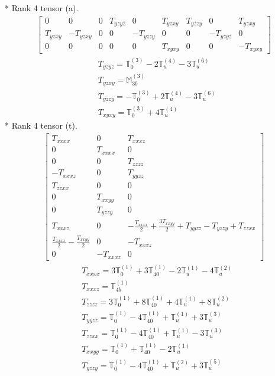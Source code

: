 \documentclass[fleqn,8pt,landscape]{jsarticle}
\begin{document}
* Rank 4 tensor (a).
\begin{align*}
\begin{bmatrix} 0 & 0 & 0 & T_{yzyz} & 0 & T_{yzxy} & T_{yzzy} & 0 & T_{yzxy} \\ T_{yzxy} & - T_{yzxy} & 0 & 0 & - T_{yzzy} & 0 & 0 & - T_{yzyz} & 0 \\ 0 & 0 & 0 & 0 & 0 & T_{xyxy} & 0 & 0 & - T_{xyxy} \end{bmatrix}
\end{align*}
\begin{align*}
& T_{yzyz} = \mathbb{T}_{0}^{(3)} - 2 \mathbb{T}_{u}^{(4)} - 3 \mathbb{T}_{u}^{(6)} \\
& T_{yzxy} = \mathbb{M}_{3b}^{(3)} \\
& T_{yzzy} = - \mathbb{T}_{0}^{(3)} + 2 \mathbb{T}_{u}^{(4)} - 3 \mathbb{T}_{u}^{(6)} \\
& T_{xyxy} = \mathbb{T}_{0}^{(3)} + 4 \mathbb{T}_{u}^{(4)}
\end{align*}
* Rank 4 tensor (t).
\begin{align*}
\begin{bmatrix} T_{xxxx} & 0 & T_{xxxz} \\ 0 & T_{xxxx} & 0 \\ 0 & 0 & T_{zzzz} \\ - T_{xxxz} & 0 & T_{yyzz} \\ T_{zzxx} & 0 & 0 \\ 0 & T_{xxyy} & 0 \\ 0 & T_{yzzy} & 0 \\ T_{xxxz} & 0 & - \frac{T_{xxxx}}{2} + \frac{3 T_{xxyy}}{2} + T_{yyzz} - T_{yzzy} + T_{zzxx} \\ \frac{T_{xxxx}}{2} - \frac{T_{xxyy}}{2} & 0 & - T_{xxxz} \\ 0 & - T_{xxxz} & 0 \end{bmatrix}
\end{align*}
\begin{align*}
& T_{xxxx} = 3 \mathbb{T}_{0}^{(1)} + 3 \mathbb{T}_{40}^{(1)} - 2 \mathbb{T}_{u}^{(1)} - 4 \mathbb{T}_{u}^{(2)} \\
& T_{xxxz} = \mathbb{T}_{4b}^{(1)} \\
& T_{zzzz} = 3 \mathbb{T}_{0}^{(1)} + 8 \mathbb{T}_{40}^{(1)} + 4 \mathbb{T}_{u}^{(1)} + 8 \mathbb{T}_{u}^{(2)} \\
& T_{yyzz} = \mathbb{T}_{0}^{(1)} - 4 \mathbb{T}_{40}^{(1)} + \mathbb{T}_{u}^{(1)} + 3 \mathbb{T}_{u}^{(3)} \\
& T_{zzxx} = \mathbb{T}_{0}^{(1)} - 4 \mathbb{T}_{40}^{(1)} + \mathbb{T}_{u}^{(1)} - 3 \mathbb{T}_{u}^{(3)} \\
& T_{xxyy} = \mathbb{T}_{0}^{(1)} + \mathbb{T}_{40}^{(1)} - 2 \mathbb{T}_{u}^{(1)} \\
& T_{yzzy} = \mathbb{T}_{0}^{(1)} - 4 \mathbb{T}_{40}^{(1)} + \mathbb{T}_{u}^{(2)} + 3 \mathbb{T}_{u}^{(5)}
\end{align*}
\end{document}
